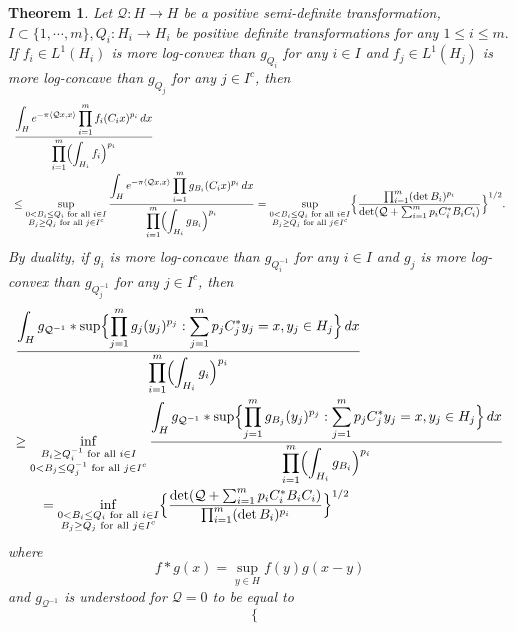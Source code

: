 \documentclass[11pt,a4paper,reqno]{amsart}
\numberwithin{equation}{section}
\newtheorem{theorem}{Theorem}[section]
\theoremstyle{definition}
\newcommand{\nm}{\noalign{\smallskip}}
\newcommand{\ds}{\displaystyle}
\newcommand{\<}{\ensuremath \leq}
\renewcommand{\>}{\ensuremath \geq}
\begin{document}
\begin{theorem} \label{Reformulation_REG_BL} 
Let $\mathcal{Q}: H \rightarrow H$ be a positive semi-definite transformation, $I \subset \{1,\cdots,m\}, Q_i: H_i \rightarrow H_i$ be positive definite transformations for any $1 \leq i \leq m.$ If $f_i \in L^1(H_i)$ is more log-convex than $g_{Q_i}$ for any $i \in I$ and $f_j \in L^1(H_j)$ is more log-concave than $g_{Q_j}$ for any $j \in I^c$, then $$\begin{array}{lll} \ds \frac{\ds \int_H e^{-\pi \langle \mathcal{Q}x,x\rangle}\prod_{i=1}^m f_i(C_ix)^{p_i}\, dx}{\ds \prod_{i=1}^m \Bigl(\int_{H_i}f_i \Bigl)^{p_i}} \\ \leq \ds \sup_{\substack{0<B_i \leq Q_i \text{ for all } i \in I \\ B_j \geq Q_j \text{ for all } j \in I^c}}\frac{\ds \int_H e^{-\pi \langle \mathcal{Q}x,x\rangle}\prod_{i=1}^m g_{B_i}(C_ix)^{p_i}\, dx}{\ds \prod_{i=1}^m \Bigl(\int_{H_i}g_{B_i} \Bigl)^{p_i}}=\sup_{\substack{0<B_i \leq Q_i \text{ for all } i \in I \\ B_j \geq Q_j \text{ for all } j \in I^c}}\Bigl \{ \frac{\prod_{i=1}^m (\det B_i)^{p_i}}{\det(\mathcal{Q}+\sum_{i=1}^m p_iC_i^* B_iC_i)}\Bigl \}^{1/2}.
    \end{array}$$
By duality, if $g_i$ is more log-concave than $g_{Q_i^{-1}}$ for any $i \in I$ and $g_j$ is more log-convex than $g_{Q_j^{-1}}$ for any $j \in I^c$, then  $$\begin{array}{lll}
    \ds \frac{\ds \int_{H}g_{\mathcal{Q}^{-1}} * \sup \Bigl \{ \prod_{j=1}^m g_j(y_j)^{p_j}: \sum_{j=1}^m p_jC_j^*y_j=x, y_j \in H_j\Bigl \}\, dx}{\ds \prod_{i=1}^m \Bigl( \int_{H_i}g_i\Bigl)^{p_i}} \\ \nm 
    \geq \ds \inf_{\substack{B_i \geq Q_i^{-1} \text{ for all } i \in I \\ 0<B_j \leq Q_j^{-1} \text{ for all } j \in I^c}}\frac{\ds \int_{H}g_{\mathcal{Q}^{-1}} *\sup \Bigl \{ \prod_{j=1}^m g_{B_j}(y_j)^{p_j}: \sum_{j=1}^m p_jC_j^*y_j=x, y_j \in H_j\Bigl \}\, dx}{\ds \prod_{i=1}^m \Bigl( \int_{H_i}g_{B_i}\Bigl)^{p_i}} \\ \nm
    \qquad \ds =\inf_{\substack{0< B_i \leq Q_i \text{ for all } i \in I \\ B_j \geq Q_j \text{ for all } j \in I^c}} \Bigl \{ \frac{\det(\mathcal{Q}+\sum_{i=1}^m p_i C_i^*B_iC_i)}{\prod_{i=1}^m (\det B_i)^{p_i}}  \Bigl \}^{1/2} \end{array}$$ where $$f * g(x)=\sup_{y \in H}f(y)g(x-y)$$ and $g_{\mathcal Q^{-1}}$ is understood for $\mathcal{Q}=0$ to be equal to $$\left\{ \begin{array}{l}

\end{array}$$
\end{theorem}
\end{document}
